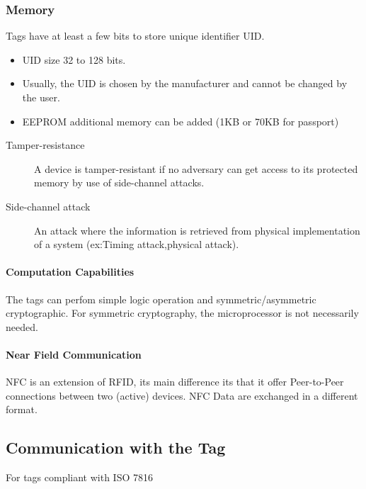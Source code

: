 \subsubsection{Memory}
Tags have at least a few bits to store unique identifier UID\@.
\begin{itemize}
        \item UID size 32 to 128 bits.
        \item Usually, the UID is chosen by the manufacturer and cannot
        be changed by the user.
        \item EEPROM additional memory can be added (1KB or 70KB for passport)
\end{itemize}

\begin{description}
    \item[Tamper-resistance] A device is tamper-resistant if no adversary can
    get access to its protected memory by use of side-channel attacks.
    \item[Side-channel attack] An attack where the information is retrieved
    from physical implementation of a system (ex:Timing attack,physical attack).
\end{description}

\paragraph{Computation Capabilities}
The tags can perfom simple logic operation and symmetric/asymmetric
cryptographic. For symmetric cryptography, the microprocessor is not
necessarily needed.

\paragraph{Near Field Communication}
NFC is an extension of RFID, its main difference its that it offer
Peer-to-Peer connections between two (active) devices. NFC Data are exchanged
in a different format.

\subsection{Communication with the Tag}
For tags compliant with \textsc{ISO 7816}
